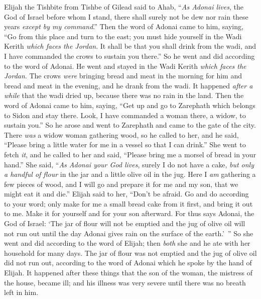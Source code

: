 \begin{biblechapter} %
 Elijah the Tishbite from Tishbe of Gilead said to Ahab, “\textit{As Adonai lives}, the God of Israel before whom I stand, there shall surely not be dew nor rain these years \textit{except by my command}.”
\verse Then the word of Adonai came to him, saying,
\verse “Go from this place and turn to the east; you must hide yourself in the Wadi Kerith \textit{which faces the Jordan}.
\verse It shall be that you shall drink from the wadi, and I have commanded the crows to sustain you there.”
\verse So he went and did according to the word of Adonai. He went and stayed in the Wadi Kerith \textit{which faces the Jordan}.
\verse The crows \textit{were} bringing bread and meat in the morning for him and bread and meat in the evening, and he drank from the wadi.
\verse It happened \textit{after a while} that the wadi dried up, because there was no rain in the land.
\verse Then the word of Adonai came to him, saying,
\verse “Get up and go to Zarephath which belongs to Sidon and stay there. Look, I have commanded a woman there, a widow, to sustain you.”
\verse So he arose and went to Zarephath and came to the gate of the city. There \textit{was} a widow woman gathering wood, so he called to her, and he said, “Please bring a little water for me in a vessel so that I can drink.”
\verse She went to fetch \textit{it}, and he called to her and said, “Please bring me a morsel of bread in your hand.”
\verse She said, “\textit{As Adonai your God lives}, surely I do not have a cake, \textit{but only a handful of flour} in the jar and a little olive oil in the jug. Here I \textit{am} gathering a few pieces of wood, and I will go and prepare it for me and my son, that we might eat it and die.”
\verse Elijah said to her, “Don’t be afraid. Go and do according to your word; only make for me a small bread cake from it first, and bring it out to me. Make it for yourself and for your son afterward.
\verse For thus says Adonai, the God of Israel: ‘The jar of flour will not be emptied and the jug of olive oil will not run out until the day Adonai gives rain on the surface of the earth.’ ”
\verse So she went and did according to the word of Elijah; then \textit{both} she and he ate with her household for many days.
\verse The jar of flour was not emptied and the jug of olive oil did not run out, according to the word of Adonai which he spoke by the hand of Elijah.
\verse It happened after these things that the son of the woman, the mistress of the house, became ill; and his illness was very severe until there was no breath left in him.

\end{biblechapter}
